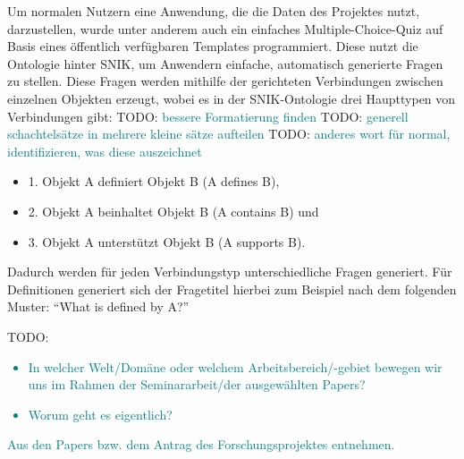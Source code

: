 \documentclass[headsepline,titlepage,ngerman,twoside,12pt]{report}
\newcommand\todo[1]{TODO: \textcolor{teal}{#1}}
\begin{document}
Um normalen Nutzern eine Anwendung, die die Daten des Projektes nutzt, darzustellen, wurde unter anderem auch ein einfaches Multiple-Choice-Quiz auf Basis eines öffentlich verfügbaren Templates programmiert.
Diese nutzt die Ontologie hinter SNIK, um Anwendern einfache, automatisch generierte Fragen zu stellen.
Diese Fragen werden mithilfe der gerichteten Verbindungen zwischen einzelnen Objekten erzeugt, wobei es in der SNIK-Ontologie drei Haupttypen von Verbindungen gibt:
\todo{bessere Formatierung finden}
\todo{generell schachtelsätze in mehrere kleine sätze aufteilen}
\todo{anderes wort für normal, identifizieren, was diese auszeichnet}
\begin{itemize}
    \item 1. Objekt A definiert Objekt B (A defines B),
    \item 2. Objekt A beinhaltet Objekt B (A contains B) und
    \item 3. Objekt A unterstützt Objekt B (A supports B).
\end{itemize}
Dadurch werden für jeden Verbindungstyp unterschiedliche Fragen generiert.
Für Definitionen generiert sich der Fragetitel hierbei zum Beispiel nach dem folgenden Muster:
\newline \enquote{What is defined by A?}\newline

\todo{
\begin{itemize}
\item In welcher Welt/Domäne oder welchem Arbeitsbereich/-gebiet bewegen wir uns im Rahmen der Seminararbeit/der ausgewählten Papers?
\item Worum geht es eigentlich?
\end{itemize}
Aus den Papers bzw. dem Antrag des Forschungsprojektes entnehmen.
}
\end{document}

